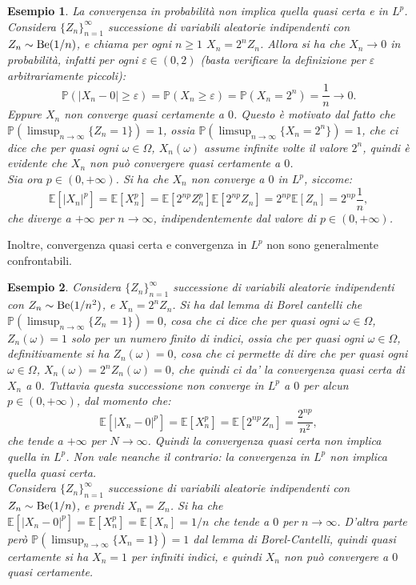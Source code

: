 \documentclass[11pt]{book}
\theoremstyle{Definizione}
\theoremstyle{TeoremaProposizioneLemmaCorollario}
\theoremstyle{OsservazioneNota}
\newtheorem{myes}{Esempio}[section]
\renewcommand{\P}{\mathbb{P}}
\newcommand{\E}{\mathbb{E}}
\begin{document}
\begin{myes}
La convergenza in probabilità non implica quella quasi certa e in $L^p$.\\
Considera $\{Z_n\}_{n = 1}^\infty$ successione di variabili aleatorie indipendenti con $Z_n \sim \textup{Be}(1/n)$, e chiama per ogni $n\geq 1$ $X_n = 2^n Z_n$. Allora si ha che $X_n \to 0$ in probabilità, infatti per ogni $\varepsilon \in (0,2)$ (basta verificare la definizione per $\varepsilon$ arbitrariamente piccoli):
$$
\P(|X_n-0|\geq \varepsilon) = \P(X_n \geq \varepsilon) = \P(X_n = 2^n) = \frac{1}{n}\to 0.
$$
Eppure $X_n$ non converge quasi certamente a $0$. Questo è motivato dal fatto che $\P(\limsup_{n \to \infty} \{Z_n = 1\}) = 1$, ossia $\P(\limsup_{n \to \infty} \{X_n = 2^n\}) = 1$, che ci dice che per quasi ogni $\omega\in \Omega$, $X_n(\omega)$ assume infinite volte il valore $2^n$, quindi è evidente che $X_n$ non può convergere quasi certamente a $0$.\\
Sia ora $p\in (0,+\infty)$. Si ha che $X_n$ non converge a $0$ in $L^p$, siccome:
$$
\E[|X_n|^p] = \E[ X_n^p] = \E[2^{np} Z_n^p] \E[2^{np}Z_n] = 2^{np} \E[Z_n] = 2^{np} \frac{1}{n},
$$
che diverge a $+\infty$ per $n \to \infty$, indipendentemente dal valore di $p\in (0,+\infty)$.
\end{myes}
Inoltre, convergenza quasi certa e convergenza in $L^p$ non sono generalmente confrontabili.
\begin{myes}
Considera $\{Z_n\}_{n = 1}^\infty$ successione di variabili aleatorie indipendenti con $Z_n \sim \textup{Be}(1/n^2)$, e $X_n = 2^n Z_n$. Si ha dal lemma di Borel cantelli che $\P(\limsup_{n \to \infty} \{Z_n = 1\}) = 0$, cosa che ci dice che per quasi ogni $\omega\in \Omega$, $Z_n(\omega) = 1$ solo per un numero finito di indici, ossia che per quasi ogni $\omega\in \Omega$, definitivamente si ha $Z_n(\omega) = 0$, cosa che ci permette di dire che per quasi ogni $\omega\in \Omega$, $X_n(\omega) = 2^nZ_n(\omega) = 0$, che quindi ci da' la convergenza quasi certa di $X_n$ a $0$. Tuttavia questa successione non converge in $L^p$ a $0$ per alcun $p\in (0,+\infty)$, dal momento che:
$$
\E[|X_n-0|^p] = \E[X_n^p] = \E[2^{np}Z_n] = \frac{2^{np}}{n^2},
$$
che tende a $+\infty$ per $N \to \infty$. Quindi la convergenza quasi certa non implica quella in $L^p$. Non vale neanche il contrario: la convergenza in $L^p$ non implica quella quasi certa.\\
Considera $\{Z_n\}_{n = 1}^\infty$ successione di variabili aleatorie indipendenti con $Z_n \sim \textup{Be}(1/n)$, e prendi $X_n = Z_n$. Si ha che $\E[|X_n-0|^p] = \E[X_n^p] = \E[X_n] = 1/n$ che tende a $0$ per $n\to \infty$. D'altra parte però $\P(\limsup_{n \to \infty} \{X_n = 1\}) = 1$ dal lemma di Borel-Cantelli, quindi quasi certamente si ha $X_n = 1$ per infiniti indici, e quindi $X_n$ non può convergere a $0$ quasi certamente.
\end{myes}
\end{document}
